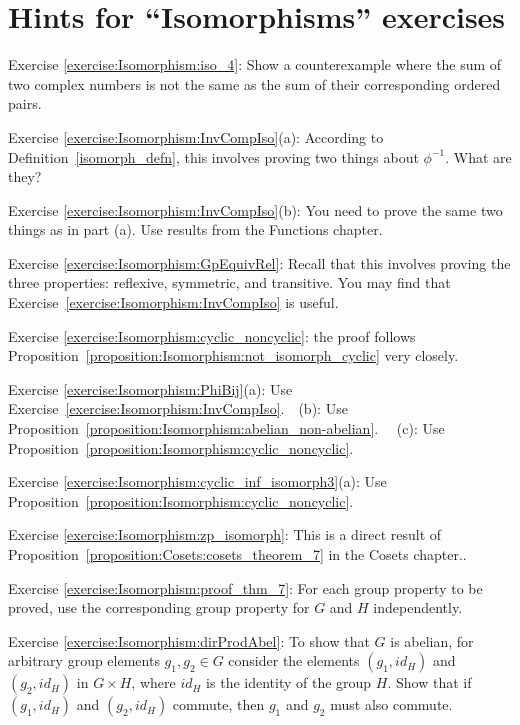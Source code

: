 \section{Hints for ``Isomorphisms'' exercises}
\label{sec:Isomorphism:Hints} 


\noindent Exercise \ref{exercise:Isomorphism:iso_4}:  Show a counterexample where the sum of two complex numbers is not the same as the sum of their corresponding ordered pairs.

\noindent Exercise \ref{exercise:Isomorphism:InvCompIso}(a):  According to Definition~\ref{isomorph_defn}, this involves proving two things about $\phi^{-1}$.  What are they?

\noindent Exercise \ref{exercise:Isomorphism:InvCompIso}(b): You need to prove the same two things as in part (a).  Use results from the Functions chapter.

\noindent Exercise \ref{exercise:Isomorphism:GpEquivRel}:   Recall that this involves proving the three properties: reflexive, symmetric, and transitive. You may find that Exercise~\ref{exercise:Isomorphism:InvCompIso}  is useful.

\noindent Exercise \ref{exercise:Isomorphism:cyclic_noncyclic}:   the proof follows Proposition~\ref{proposition:Isomorphism:not_isomorph_cyclic} very closely.

\noindent Exercise \ref{exercise:Isomorphism:PhiBij}(a): Use Exercise~\ref{exercise:Isomorphism:InvCompIso}.~~(b):  Use Proposition~\ref{proposition:Isomorphism:abelian_non-abelian}. ~~(c):  Use Proposition~\ref{proposition:Isomorphism:cyclic_noncyclic}. 

\noindent Exercise \ref{exercise:Isomorphism:cyclic_inf_isomorph3}(a): Use Proposition~\ref{proposition:Isomorphism:cyclic_noncyclic}.

\noindent Exercise \ref{exercise:Isomorphism:zp_isomorph}: This  is a direct result of Proposition~\ref{proposition:Cosets:cosets_theorem_7} in the Cosets chapter..

\noindent Exercise \ref{exercise:Isomorphism:proof_thm_7}: For each group property to be proved, use the corresponding group property for $G$ and $H$ independently.

\noindent Exercise \ref{exercise:Isomorphism:dirProdAbel}: To show that $G$ is abelian, for arbitrary group elements $g_1, g_2 \in G$ consider the elements $(g_1, id_H)$ and $(g_2,id_H)$ in $G \times H$, where $id_H$ is the identity of the group $H$.  Show that if $(g_1, id_H)$ and $(g_2,id_H)$ commute, then $g_1$ and $g_2$ must also commute. 



